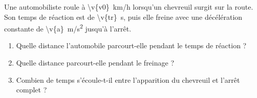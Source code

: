 Une automobiliste roule à \qty{\v{v0}}{km/h} lorsqu'un chevreuil surgit sur la route. Son temps de réaction est de \qty{\v{tr}}{s}, puis elle freine avec une décélération constante de \qty{\v{a}}{m/s^2} jusqu'à l'arrêt.

\begin{enumerate}[label=\alph*)]
    \item Quelle distance l'automobile parcourt-elle pendant le temps de réaction ?
    \item Quelle distance parcourt-elle pendant le freinage ?
    \item Combien de temps s'écoule-t-il entre l'apparition du chevreuil et l'arrêt complet ?
\end{enumerate}
